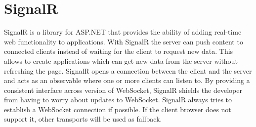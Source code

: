 \section{SignalR}
SignalR is a library for ASP.NET that provides the ability of adding real-time web functionality to applications. With SignalR the server can push content to connected clients instead of waiting for the client to request new data. This allows to create applications which can get new data from the server without refreshing the page. SignalR opens a connection between the client and the server and acts as an observable where one or more clients can listen to. By providing a consistent interface across version of WebSocket, SignalR shields the developer from having to worry about updates to WebSocket. SignalR always tries to establish a WebSocket connection if possible. If the client browser does not support it, other transports will be used as fallback.